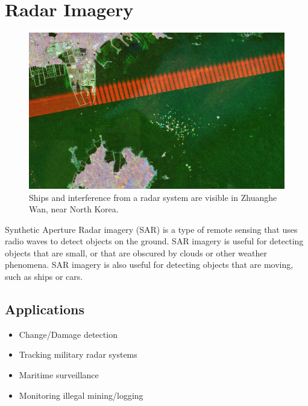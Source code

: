 \documentclass[
  letterpaper,
  DIV=11,
  numbers=noendperiod]{scrreprt}
\providecommand{\tightlist}{%
  \setlength{\itemsep}{0pt}\setlength{\parskip}{0pt}}\usepackage{longtable,booktabs,array}
\begin{document}
\hypertarget{radar-imagery}{%
\section{Radar Imagery}\label{radar-imagery}}

\begin{figure}

{\centering \includegraphics{././images/radar ships.jpg}

}

\caption{Ships and interference from a radar system are visible in
Zhuanghe Wan, near North Korea.}

\end{figure}

Synthetic Aperture Radar imagery (SAR) is a type of remote sensing that
uses radio waves to detect objects on the ground. SAR imagery is useful
for detecting objects that are small, or that are obscured by clouds or
other weather phenomena. SAR imagery is also useful for detecting
objects that are moving, such as ships or cars.

\hypertarget{applications-1}{%
\subsection*{Applications}\label{applications-1}}

\begin{itemize}
\tightlist
\item
  Change/Damage detection
\item
  Tracking military radar systems
\item
  Maritime surveillance
\item
  Monitoring illegal mining/logging
\end{itemize}
\end{document}
